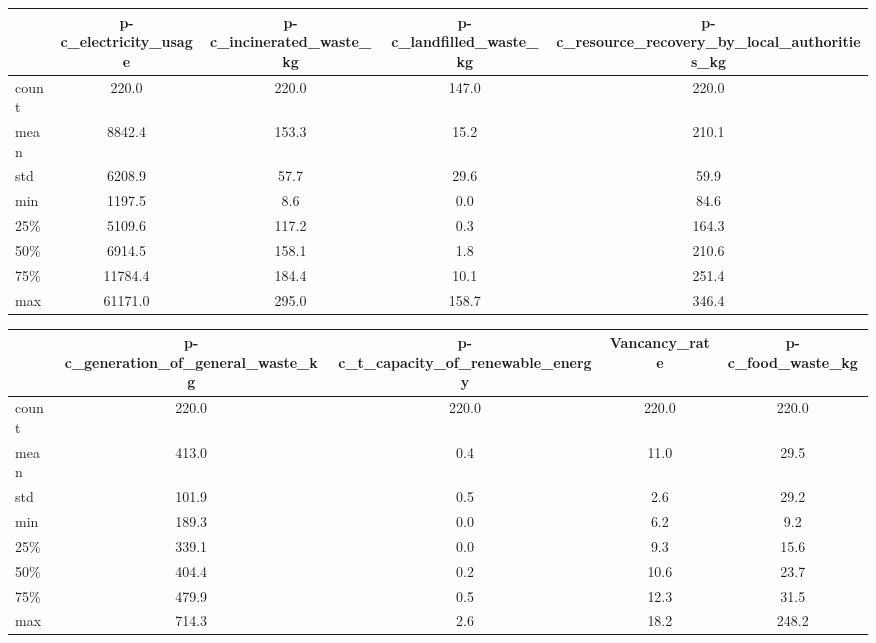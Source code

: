 \documentclass{article}
\begin{document}
    \begin{table}[H]
        \centering
        \footnotesize
        \begin{tabular}{l S S S S}
        \toprule
         & {p-c\_electricity\_usage} & {p-c\_incinerated\_waste\_kg} & {p-c\_landfilled\_waste\_kg} & {p-c\_resource\_recovery\_by\_local\_authorities\_kg} \\
        \midrule
        count & 220.0 & 220.0 & 147.0 & 220.0 \\
        mean & 8842.4 & 153.3 & 15.2 & 210.1 \\
        std & 6208.9 & 57.7 & 29.6 & 59.9 \\
        min & 1197.5 & 8.6 & 0.0 & 84.6 \\
        25\% & 5109.6 & 117.2 & 0.3 & 164.3 \\
        50\% & 6914.5 & 158.1 & 1.8 & 210.6 \\
        75\% & 11784.4 & 184.4 & 10.1 & 251.4 \\
        max & 61171.0 & 295.0 & 158.7 & 346.4 \\
        \bottomrule
        \end{tabular}
        \label{tab:summary-stats-part2}
        \end{table}
\begin{table}[H]
\centering
\footnotesize
\begin{tabular}{l S S S S}
\toprule
 & {p-c\_generation\_of\_general\_waste\_kg} & {p-c\_t\_capacity\_of\_renewable\_energy} & {Vancancy\_rate} & {p-c\_food\_waste\_kg} \\
\midrule
count & 220.0 & 220.0 & 220.0 & 220.0 \\
mean & 413.0 & 0.4 & 11.0 & 29.5 \\
std & 101.9 & 0.5 & 2.6 & 29.2 \\
min & 189.3 & 0.0 & 6.2 & 9.2 \\
25\% & 339.1 & 0.0 & 9.3 & 15.6 \\
50\% & 404.4 & 0.2 & 10.6 & 23.7 \\
75\% & 479.9 & 0.5 & 12.3 & 31.5 \\
max & 714.3 & 2.6 & 18.2 & 248.2 \\
\bottomrule
\end{tabular}
\label{tab:summary-stats-part3}
\end{table}
\end{document}
